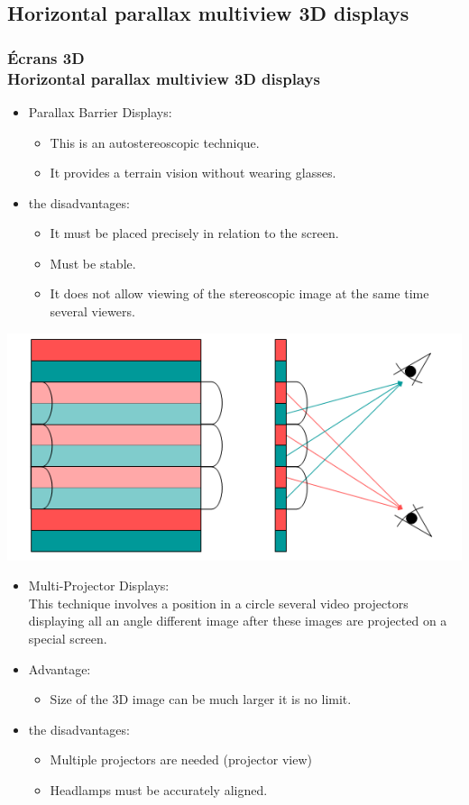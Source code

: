 \subsection{Horizontal parallax multiview 3D displays}	

\begin{frame}

  \frametitle{Écrans 3D \\Horizontal parallax multiview 3D displays} 
  
  \begin{itemize}
  \item Parallax Barrier Displays:
    
    \begin{itemize}
    \item This is an autostereoscopic technique.
    \item It provides a terrain vision without wearing glasses.
    \end{itemize}
  \item the disadvantages:
    \begin{itemize} 	
    \item	It must be placed precisely in relation to the screen.
    \item Must be stable.
    \item It does not allow viewing of the stereoscopic image at the same time several viewers.
    \end{itemize}
  \end{itemize}
  \includegraphics[keepaspectratio,height=.13\linewidth]{4.png}
\end{frame}

\begin{frame}
  \begin{itemize}
  \item Multi-Projector Displays:\\
 This technique involves a position in a circle several video projectors displaying all an angle different image after these images are projected on a special screen.			
  \item Advantage:
    \begin{itemize} 
    \item Size of the 3D image can be much larger it is no limit.
    \end{itemize}
  \item the disadvantages:
    \begin{itemize} 	
    \item	Multiple projectors are needed (projector view)
    \item Headlamps must be accurately aligned.
    \end{itemize}
  \end{itemize}
\end{frame}

